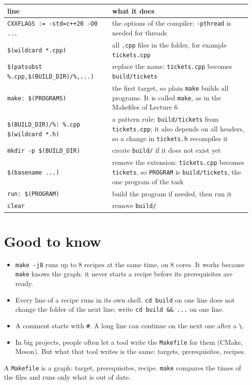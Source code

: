\documentclass[a4paper,11pt]{article}
\begin{document}
\begin{center}
\renewcommand{\arraystretch}{1.25}
\begin{tabularx}{\linewidth}{@{}>{\raggedright\arraybackslash}p{5.2cm}X@{}}
\toprule
line & what it does \\
\midrule
\texttt{CXXFLAGS := -std=c++20 -O0 ...} & the options of the compiler; \texttt{-pthread} is needed for threads \\
\texttt{\$(wildcard *.cpp)} & all \texttt{.cpp} files in the folder, for example \texttt{tickets.cpp} \\
\texttt{\$(patsubst \%.cpp,\$(BUILD\_DIR)/\%,...)} & replace the name: \texttt{tickets.cpp} becomes \texttt{build/tickets} \\
\texttt{make: \$(PROGRAMS)} & the first target, so plain \texttt{make} builds all programs. It is called \texttt{make}, as in
  the Makefiles of Lecture 6 \\
\texttt{\$(BUILD\_DIR)/\%: \%.cpp \$(wildcard *.h)} & a pattern rule: \texttt{build/tickets} from \texttt{tickets.cpp}; it also depends on all
  headers, so a change in \texttt{tickets.h} recompiles it \\
\texttt{mkdir -p \$(BUILD\_DIR)} & create \texttt{build/} if it does not exist yet \\
\texttt{\$(basename ...)} & remove the extension: \texttt{tickets.cpp} becomes \texttt{tickets}, so \texttt{PROGRAM} is
  \texttt{build/tickets}, the one program of the task \\
\texttt{run: \$(PROGRAM)} & build the program if needed, then run it \\
\texttt{clear} & remove \texttt{build/} \\
\bottomrule
\end{tabularx}
\end{center}

\section{Good to know}

\begin{itemize}
  \item \texttt{make -j8} runs up to 8 recipes at the same time, on 8 cores. It works because \texttt{make} knows the
        graph: it never starts a recipe before its prerequisites are ready.
  \item Every line of a recipe runs in its own shell. \texttt{cd build} on one line does not change the folder of the next
        line; write \texttt{cd build \&\& ...} on one line.
  \item A comment starts with \texttt{\#}. A long line can continue on the next one after a \texttt{\textbackslash}.
  \item In big projects, people often let a tool write the \texttt{Makefile} for them (CMake, Meson). But what that
        tool writes is the same: targets, prerequisites, recipes.
\end{itemize}

\begin{keymsg}
A \texttt{Makefile} is a graph: target, prerequisites, recipe. \texttt{make} compares the times of the files and runs
only what is out of date.
\end{keymsg}
\end{document}
